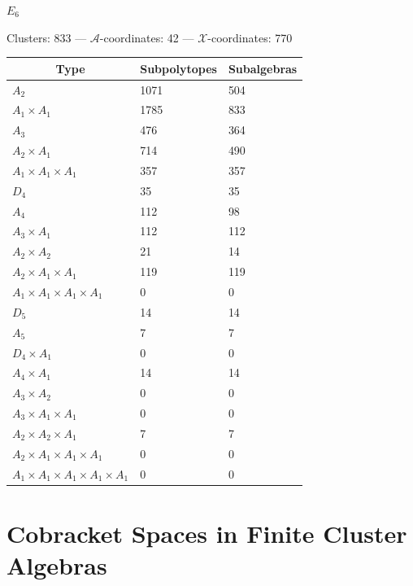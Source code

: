 \documentclass[11pt]{article}
\def\xcoords{$\mathcal{X}$-coordinates}
\def\acoords{$\mathcal{A}$-coordinates}
\begin{document}
\begin{center}
\newpage

{ \qquad \qquad \Large{\(E_6\)} \hfill}

\vspace{.2cm}
\qquad Clusters: 833 \quad --- \quad \acoords: 42 \quad --- \quad \xcoords: 770 \hfill \\[1em]

\begin{tabular}{ | l | l | l |}
\multicolumn{1}{c}{Type} &  \multicolumn{1}{c}{Subpolytopes}  &  \multicolumn{1}{c}{Subalgebras} \\
\hline \(A_2\) & 1071 & 504 \\ 
\hline \(A_1 \times A_1\) & 1785 & 833 \\ \hline 
\hline \(A_3\) & 476 & 364 \\ 
\hline \(A_2 \times A_1\) & 714 & 490 \\ 
\hline \(A_1 \times A_1 \times A_1\) & 357 & 357 \\ \hline 
\hline \(D_4\) & 35 & 35 \\ 
\hline \(A_4\) & 112 & 98 \\ 
\hline \(A_3 \times A_1\) & 112 & 112 \\ 
\hline \(A_2 \times A_2\) & 21 & 14 \\ 
\hline \(A_2 \times A_1 \times A_1\) & 119 & 119 \\ 
\hline \(A_1 \times A_1 \times A_1 \times A_1\) & 0 & 0 \\ \hline 
\hline \(D_5\) & 14 & 14 \\ 
\hline \(A_5\) & 7 & 7 \\ 
\hline \(D_4 \times A_1\) & 0 & 0 \\ 
\hline \(A_4 \times A_1\) & 14 & 14 \\ 
\hline \(A_3 \times A_2\) & 0 & 0 \\ 
\hline \(A_3 \times A_1 \times A_1\) & 0 & 0 \\ 
\hline \(A_2 \times A_2 \times A_1\) & 7 & 7 \\ 
\hline \(A_2 \times A_1 \times A_1 \times A_1\) & 0 & 0 \\ 
\hline \(A_1 \times A_1 \times A_1 \times A_1 \times A_1\) & 0 & 0 \\ 
\hline
\end{tabular}
\end{center}

\newpage

\section{Cobracket Spaces in Finite Cluster Algebras}\label{appendix:cobrackets}
\end{document}
